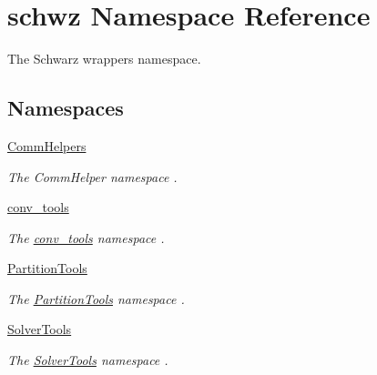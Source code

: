 \hypertarget{namespaceschwz}{}\section{schwz Namespace Reference}
\label{namespaceschwz}


The Schwarz wrappers namespace.  


\subsection*{Namespaces}
\begin{DoxyCompactItemize}
\item 
 \hyperlink{namespaceschwz_1_1CommHelpers}{Comm\+Helpers}
\begin{DoxyCompactList}\small\item\em The Comm\+Helper namespace . \end{DoxyCompactList}\item 
 \hyperlink{namespaceschwz_1_1conv__tools}{conv\+\_\+tools}
\begin{DoxyCompactList}\small\item\em The \hyperlink{namespaceschwz_1_1conv__tools}{conv\+\_\+tools} namespace . \end{DoxyCompactList}\item 
 \hyperlink{namespaceschwz_1_1PartitionTools}{Partition\+Tools}
\begin{DoxyCompactList}\small\item\em The \hyperlink{namespaceschwz_1_1PartitionTools}{Partition\+Tools} namespace . \end{DoxyCompactList}\item 
 \hyperlink{namespaceschwz_1_1SolverTools}{Solver\+Tools}
\begin{DoxyCompactList}\small\item\em The \hyperlink{namespaceschwz_1_1SolverTools}{Solver\+Tools} namespace . \end{DoxyCompactList}\end{DoxyCompactItemize}
